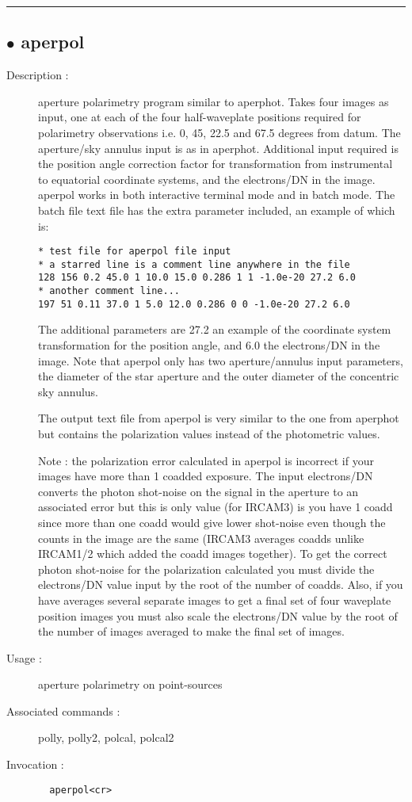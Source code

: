 \hrule \subsection*{$\bullet$ aperpol}
\begin{description}
\item[Description :] aperture polarimetry program similar to aperphot.  Takes four
images as input, one at each of the four half-waveplate positions
required for polarimetry observations i.e. 0, 45, 22.5 and 67.5 degrees
from datum.  The aperture/sky annulus input is as in aperphot.
Additional input required is the position angle correction factor for
transformation from instrumental to equatorial coordinate systems, and
the electrons/DN in the image.  aperpol works in both interactive
terminal mode and in batch mode.  The batch file text file has the extra
parameter included, an example of which is:

\begin{verbatim}
* test file for aperpol file input
* a starred line is a comment line anywhere in the file
128 156 0.2 45.0 1 10.0 15.0 0.286 1 1 -1.0e-20 27.2 6.0
* another comment line...
197 51 0.11 37.0 1 5.0 12.0 0.286 0 0 -1.0e-20 27.2 6.0
\end{verbatim}

The additional parameters are 27.2 an example of the coordinate system
transformation for the position angle, and 6.0 the electrons/DN in the
image.  Note that aperpol only has two aperture/annulus input parameters,
the diameter of the star aperture and the outer diameter of the
concentric sky annulus.

The output text file from aperpol is very similar to the one from
aperphot but contains the polarization values instead of the photometric
values. 

Note : the polarization error calculated in aperpol is incorrect if your
images have more than 1 coadded exposure.  The input electrons/DN
converts the photon shot-noise on the signal in the aperture to an
associated error but this is only value (for {\sc IRCAM3}) is you have 1 coadd
since more than one coadd would give lower shot-noise even though the
counts in the image are the same ({\sc IRCAM3} averages coadds unlike {\sc IRCAM1/2}
which added the coadd images together).  To get the correct photon
shot-noise for the polarization calculated you must divide the
electrons/DN value input by the root of the number of coadds.  Also, if
you have averages several separate images to get a final set of four
waveplate position images you must also scale the electrons/DN value by
the root of the number of images averaged to make the final set of
images.

\item[Usage :] aperture polarimetry on point-sources
\item[Associated commands :] polly, polly2, polcal, polcal2
\item[Invocation :]

\verb+  aperpol<cr> +\end{description}

